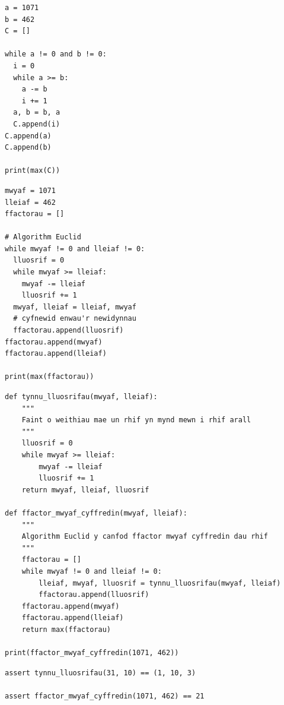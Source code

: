 \documentclass{beamer}
\begin{document}
\begin{frame}[fragile]
\scriptsize{
\begin{verbatim}
a = 1071
b = 462
C = []

while a != 0 and b != 0:
  i = 0
  while a >= b:
    a -= b
    i += 1
  a, b = b, a
  C.append(i)
C.append(a)
C.append(b)

print(max(C))
\end{verbatim}
}
\end{frame}

\begin{frame}[fragile]
\scriptsize{
\begin{verbatim}
mwyaf = 1071
lleiaf = 462
ffactorau = []

# Algorithm Euclid
while mwyaf != 0 and lleiaf != 0:
  lluosrif = 0
  while mwyaf >= lleiaf:
    mwyaf -= lleiaf
    lluosrif += 1
  mwyaf, lleiaf = lleiaf, mwyaf
  # cyfnewid enwau'r newidynnau
  ffactorau.append(lluosrif)
ffactorau.append(mwyaf)
ffactorau.append(lleiaf)

print(max(ffactorau))
\end{verbatim}
}
\end{frame}

\begin{frame}[fragile]
\scriptsize{
\begin{verbatim}
def tynnu_lluosrifau(mwyaf, lleiaf):
    """
    Faint o weithiau mae un rhif yn mynd mewn i rhif arall
    """
    lluosrif = 0
    while mwyaf >= lleiaf:
        mwyaf -= lleiaf
        lluosrif += 1
    return mwyaf, lleiaf, lluosrif

def ffactor_mwyaf_cyffredin(mwyaf, lleiaf):
    """
    Algorithm Euclid y canfod ffactor mwyaf cyffredin dau rhif
    """
    ffactorau = []
    while mwyaf != 0 and lleiaf != 0:
        lleiaf, mwyaf, lluosrif = tynnu_lluosrifau(mwyaf, lleiaf)
        ffactorau.append(lluosrif)
    ffactorau.append(mwyaf)
    ffactorau.append(lleiaf)
    return max(ffactorau)

print(ffactor_mwyaf_cyffredin(1071, 462))
\end{verbatim}
}
\end{frame}

\begin{frame}[fragile]
\begin{verbatim}
assert tynnu_lluosrifau(31, 10) == (1, 10, 3)

assert ffactor_mwyaf_cyffredin(1071, 462) == 21
\end{verbatim}
\end{frame}
\end{document}
